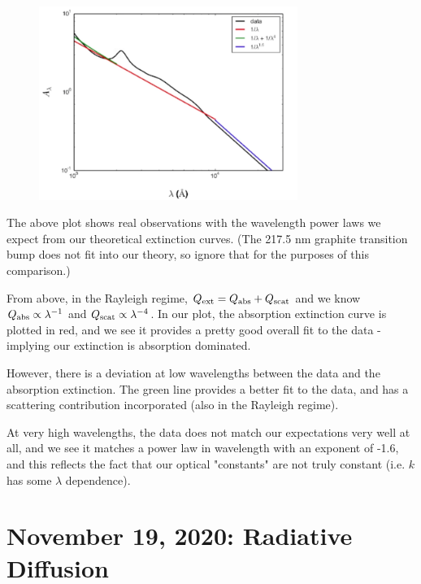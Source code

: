 \documentclass{article}
\begin{document}
\begin{figure}[ht]
    \centering
    \includegraphics[width=0.75\textwidth]{800px-Obsv.png}
    \label{fig:obsv}
\end{figure}

The above plot shows real observations with the wavelength power laws we expect from our theoretical extinction curves. (The 217.5 nm graphite transition bump does not fit into our theory, so ignore that for the purposes of this comparison.)

From above, in the Rayleigh regime, $Q_{\rm{ext}} = Q_{\rm{abs}} + Q_{\rm{scat}}$ and we know $Q_{\rm{abs}} \propto \lambda^{-1}$ and $Q_{\rm{scat}} \propto \lambda^{-4}$. In our plot, the absorption extinction curve is plotted in red, and we see it provides a pretty good overall fit to the data - implying our extinction is absorption dominated. 

However, there is a deviation at low wavelengths between the data and the absorption extinction. The green line provides a better fit to the data, and has a scattering contribution incorporated (also in the Rayleigh regime). 

At very high wavelengths, the data does not match our expectations very well at all, and we see it matches a power law in wavelength with an exponent of -1.6, and this reflects the fact that our optical "constants" are not truly constant (i.e. $k$ has some $\lambda$ dependence). 


\newpage
\section{November 19, 2020: Radiative Diffusion}
\end{document}
